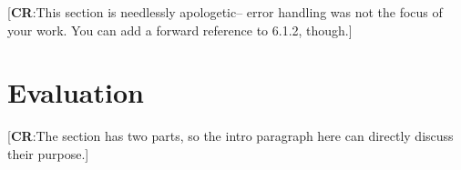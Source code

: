\documentclass[nofilelist]{cslthse-msc}
\newcommand{\CR}[1]{\textcolor{green!60!black}{[\textbf{CR}:#1]}}
\begin{document}
\CR{This section is needlessly apologetic-- error handling was not the focus of your work.  You can add a forward reference to 6.1.2, though.}

%
%
%

%


\chapter{Evaluation} %
\CR{The section has two parts, so the intro paragraph here can directly discuss their purpose.}
\end{document}
